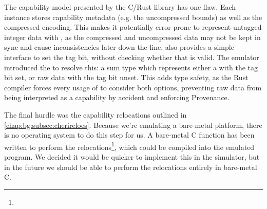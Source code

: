 The capability model presented by the C/Rust library has one flaw.\label{safetaggedcap}
Each  instance stores capability metadata (e.g. the uncompressed bounds) as well as the compressed encoding.
This makes it potentially error-prone to represent untagged integer data with , as the compressed and uncompressed data may not be kept in sync and cause inconsistencies later down the line.
 also provides a simple interface to set the tag bit, without checking whether that is valid.
The emulator introduced the  to resolve this: a sum type which represents either a  with the tag bit set, or raw data with the tag bit unset.
This adds type safety, as the Rust compiler forces every usage of  to consider both options, preventing raw data from being interpreted as a capability by accident and enforcing Provenance.

The final hurdle was the capability relocations outlined in \cref{chap:bg:subsec:cherirelocs}.
Because we're emulating a bare-metal platform, there is no operating system to do this step for us.
A bare-metal C function has been written to perform the relocations\footnote{}, which could be compiled into the emulated program.
We decided it would be quicker to implement this in the simulator, but
in the future we should be able to perform the relocations entirely in bare-metal C.
